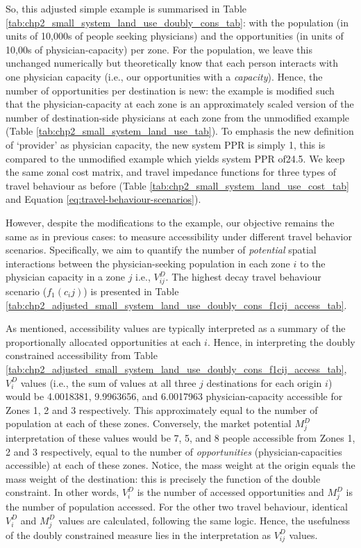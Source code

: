 \documentclass[
11pt, %
oneside, %
english, %
singlespacing, %
]{macthesis} %
\begin{document}
So, this adjusted simple example is summarised in Table \ref{tab:chp2_small_system_land_use_doubly_cons_tab}: with the population (in units of 10,000s of people seeking physicians) and the opportunities (in units of 10,00s of physician-capacity) per zone. For the population, we leave this unchanged numerically but theoretically know that each person interacts with one physician capacity (i.e., our opportunities with a \emph{capacity}). Hence, the number of opportunities per destination is new: the example is modified such that the physician-capacity at each zone is an approximately scaled version of the number of destination-side physicians at each zone from the unmodified example (Table \ref{tab:chp2_small_system_land_use_tab}). To emphasis the new definition of `provider' as physician capacity, the new system PPR is simply 1, this is compared to the unmodified example which yields system PPR of24.5. We keep the same zonal cost matrix, and travel impedance functions for three types of travel behaviour as before (Table \ref {tab:chp2_small_system_land_use_cost_tab} and Equation \ref{eq:travel-behaviour-scenarios}).



However, despite the modifications to the example, our objective remains the same as in previous cases: to measure accessibility under different travel behavior scenarios. Specifically, we aim to quantify the number of \emph{potential} spatial interactions between the physician-seeking population in each zone \(i\) to the physician capacity in a zone \(j\) i.e., \(V_{ij}^D\). The highest decay travel behaviour scenario (\(f_1(c_ij)\)) is presented in Table \ref{tab:chp2_adjusted_small_system_land_use_doubly_cons_f1cij_access_tab}.



As mentioned, accessibility values are typically interpreted as a summary of the proportionally allocated opportunities at each \(i\). Hence, in interpreting the doubly constrained accessibility from Table \ref{tab:chp2_adjusted_small_system_land_use_doubly_cons_f1cij_access_tab}, \(V_i^D\) values (i.e., the sum of values at all three \(j\) destinations for each origin \(i\)) would be 4.0018381, 9.9963656, and 6.0017963 physician-capacity accessible for Zones 1, 2 and 3 respectively. This approximately equal to the number of population at each of these zones. Conversely, the market potential \(M_j^D\) interpretation of these values would be 7, 5, and 8 people accessible from Zones 1, 2 and 3 respectively, equal to the number of \emph{opportunities} (physician-capacities accessible) at each of these zones. Notice, the mass weight at the origin equals the mass weight of the destination: this is precisely the function of the double constraint. In other words, \(V_i^D\) is the number of accessed opportunities and \(M_j^D\) is the number of population accessed. For the other two travel behaviour, identical \(V_i^D\) and \(M_j^D\) values are calculated, following the same logic. Hence, the usefulness of the doubly constrained measure lies in the interpretation as \(V_{ij}^D\) values.
\end{document}
